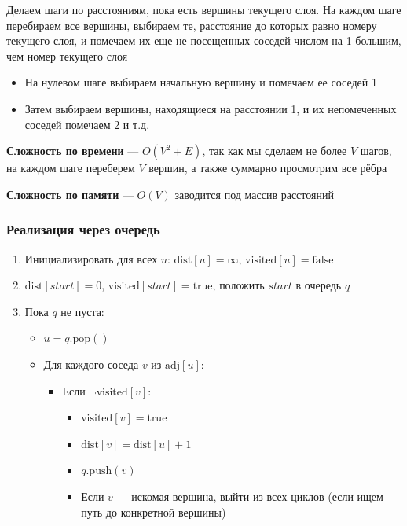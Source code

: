 \documentclass[a4paper]{article}
\begin{document}
Делаем шаги по расстояниям, пока есть вершины текущего слоя. На каждом шаге перебираем все вершины, выбираем те, расстояние до которых равно номеру текущего слоя, и помечаем их еще не посещенных соседей числом на 1 большим, чем номер текущего слоя

\begin{itemize}
    \item На нулевом шаге выбираем начальную вершину и помечаем ее соседей 1
    \item Затем выбираем вершины, находящиеся на расстоянии 1, и их непомеченных соседей помечаем 2 и т.д.
\end{itemize}

\textbf{Сложность по времени} — $O(V^2+E)$, так как мы сделаем не более $V$ шагов, на каждом шаге переберем $V$ вершин, а также суммарно просмотрим все рёбра

\textbf{Сложность по памяти} — $O(V)$ заводится под массив расстояний

\subsubsection*{Реализация через очередь}
\begin{enumerate}
    \item Инициализировать для всех $u$: $\text{dist}[u]=\infty$, $\text{visited}[u]=\text{false}$
    \item $\text{dist}[start]=0$, $\text{visited}[start]=\text{true}$, положить $start$ в очередь $q$
    \item Пока $q$ не пуста:
    \begin{itemize}
        \item $u = q.\text{pop}()$
        \item Для каждого соседа $v$ из $\mathrm{adj}[u]$:
        \begin{itemize}
            \item Если $\neg\text{visited}[v]$:
            \begin{itemize}
                \item $\text{visited}[v]=\text{true}$
                \item $\text{dist}[v]=\text{dist}[u]+1$
                \item $q.\text{push}(v)$
                \item Если $v$ — искомая вершина, выйти из всех циклов (если ищем путь до конкретной вершины)
            \end{itemize}
        \end{itemize}
    \end{itemize}
\end{enumerate}
\end{document}
